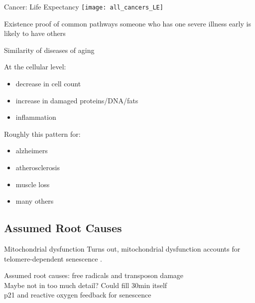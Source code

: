 \begin{frame}[c]{Cancer: Life Expectancy}
    \large
    \texttt{[image: all\_cancers\_LE]} \\
    \cite{botta2019changes}
\end{frame}


\begin{frame}[c]{Existence proof of common pathways}
    \large
    someone who has one severe illness early is likely to have others \\
\end{frame}


\begin{frame}[c]{Similarity of diseases of aging}

    \large

    \cite{CorePath13:online}
    At the cellular level:
    \begin{itemize}[<+(1)->]
        \item decrease in cell count
        \item increase in damaged proteins/DNA/fats
        \item inflammation
    \end{itemize}
    \pause

    Roughly this pattern for:
    \begin{itemize}[<+(1)->]
        \item alzheimers
        \item atherosclerosis
        \item muscle loss
        \item many others
    \end{itemize}

\end{frame}



\subsection{Assumed Root Causes}


\begin{frame}[c]{Mitochondrial dysfunction}
    \large
    Turns out, mitochondrial dysfunction accounts for telomere-dependent senescence \cite{passos2007mitochondrial}.
\end{frame}


\begin{frame}[c]
    \large
    Assumed root causes: free radicals and transposon damage \\
    Maybe not in too much detail? Could fill 30min itself \cite{CorePath13:online} \\

    p21 and reactive oxygen feedback for senescence \cite{passos2010feedback}
\end{frame}

